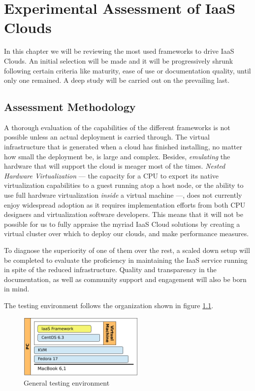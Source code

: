 \chapter{Experimental Assessment of IaaS Clouds}\label{cap:evaliaas}
\noindent In this chapter we will be reviewing the most used frameworks to drive IaaS Clouds. An initial selection will be made and it will be progressively shrunk following certain criteria like maturity, ease of use or documentation quality, until only one remained. A deep study will be carried out on the prevailing last.

\section{Assessment Methodology}\label{sec:evaluacion}
\noindent A thorough evaluation of the capabilities of the different frameworks is not possible unless an actual deployment is carried through. The virtual infrastructure that is generated when a cloud has finished installing, no matter how small the deployment be, is large and complex. Besides, \emph{emulating} the hardware that will support the cloud is meager most of the times. \emph{Nested Hardware Virtualization} --- the capacity for a CPU to export its native virtualization capabilities to a guest running atop a host node, or the ability to use full hardware virtualization \emph{inside} a virtual machine ---, does not currently enjoy widespread adoption as it requires implementation efforts from both CPU designers and virtualization software developers. This means that it will not be possible for us to fully appraise the myriad IaaS Cloud solutions by creating a virtual cluster over which to deploy our clouds, and make performance measures.

To diagnose the superiority of one of them over the rest, a scaled down setup will be completed to evaluate the proficiency in maintaining the IaaS service running in spite of the reduced infrastructure. Quality and transparency in the documentation, as well as community support and engagement will also be born in mind.

The testing environment follows the organization shown in figure \ref{fig:espacioprueba}.

\begin{figure}[tbp]
\begin{center}
\includegraphics[width=0.55\textwidth]{imagenes/007.pdf}
 \caption{General testing environment}
\label{fig:espacioprueba}
\end{center}
\end{figure}

